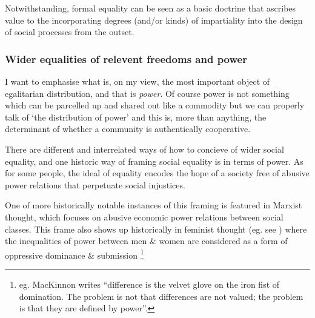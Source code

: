Notwithstanding, formal equality can be seen as a basic doctrine that ascribes value to the incorporating degrees (and/or kinds) of impartiality into the design of social processes from the outset.%

\subsubsection{Wider equalities of relevent freedoms and power}

\begin{displayquote}
I want to emphasise what is, on my view, the most important object of egalitarian distribution, and that is \textit{power}. Of course power is not something which can be parcelled up and shared out like a commodity but we can properly talk of `the distribution of power' and this is, more than anything, the determinant of whether a community is authentically cooperative.\cite{TheSocialBasisofEquality:1998}
\end{displayquote}

There are different and interrelated ways of how to concieve of wider social equality, and one historic way of framing social equality is in terms of power.
As for some people, the ideal of equality encodes the hope of a society free of abusive power relations that perpetuate social injustices.

One of more historically notable instances of this framing is featured in Marxist thought, which focuses on abusive economic power relations between social classes. This frame also shows up historically in feminist thought (eg. see \cite{Cudd2006-CUDAO}) where the inequalities of power between men \& women are considered as a form of oppressive dominance \& submission \footnote{eg. MacKinnon writes ``difference is the velvet glove on the iron fist of domination. The problem is not that differences are not valued; the problem is that they are defined by power''\cite{mackinnon1989toward}.}

